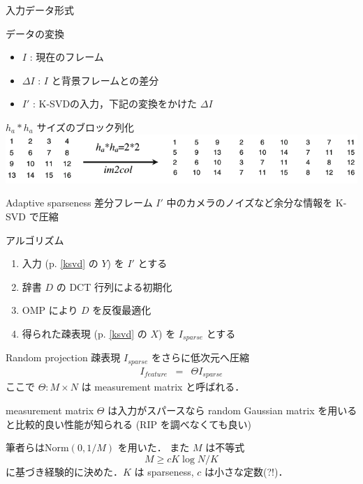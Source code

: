 \begin{frame}{入力データ形式}
\begin{block}{データの変換}
\begin{itemize}
 \item $I$ : 現在のフレーム
 \item $\Delta I$ : $I$ と背景フレームとの差分
 \item $I'$ : K-SVDの入力，下記の変換をかけた $\Delta I$
\end{itemize}
\end{block}
$h_a * h_a$ サイズのブロック列化
\includegraphics[scale=0.5]{figure/im2col.png}
\end{frame}


\begin{frame}{Adaptive sparseness}
差分フレーム $I'$ 中のカメラのノイズなど余分な情報を K-SVD で圧縮

\begin{block}{アルゴリズム}
\begin{enumerate}
    \item 入力 (p. \ref{ksvd} の $Y$) を $I'$ とする
    \item 辞書 $D$ の DCT 行列による初期化
    \item OMP により $D$ を反復最適化
    \item 得られた疎表現 (p. \ref{ksvd} の $X$) を $I_{sparse}$ とする
\end{enumerate}
\end{block}
\end{frame}



\begin{frame}{Random projection}
疎表現 $I_{sparse}$ をさらに低次元へ圧縮
\begin{eqnarray}
    I_{feature} & = & \Theta I_{sparse}
\end{eqnarray}
ここで $\Theta : M \times N$ は measurement matrix と呼ばれる．
\begin{block}{measurement matrix}
$\Theta$ は入力がスパースなら random Gaussian matrix を用いると比較的良い性能が知られる (RIP を調べなくても良い)
\end{block}
筆者らは$\mathrm{Norm}(0, 1/M)$ を用いた．
また $M$ は不等式
\begin{equation}
    M \geq c K \log{N/K}
\end{equation}
に基づき経験的に決めた．$K$ は sparseness, $c$ は小さな定数(?!)．
\end{frame}


